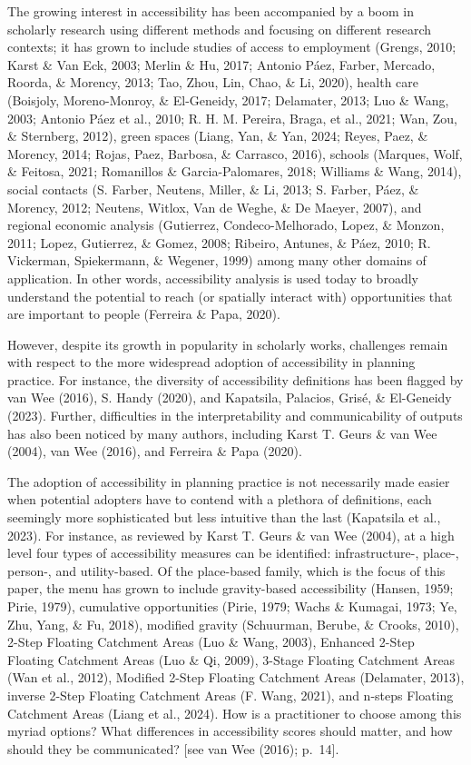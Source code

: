 \documentclass[
11pt, %
oneside, %
english, %
singlespacing, %
]{macthesis} %
\begin{document}
The growing interest in accessibility has been accompanied by a boom in scholarly research using different methods and focusing on different research contexts; it has grown to include studies of access to employment (Grengs, 2010; Karst \& Van Eck, 2003; Merlin \& Hu, 2017; Antonio Páez, Farber, Mercado, Roorda, \& Morency, 2013; Tao, Zhou, Lin, Chao, \& Li, 2020), health care (Boisjoly, Moreno-Monroy, \& El-Geneidy, 2017; Delamater, 2013; Luo \& Wang, 2003; Antonio Páez et al., 2010; R. H. M. Pereira, Braga, et al., 2021; Wan, Zou, \& Sternberg, 2012), green spaces (Liang, Yan, \& Yan, 2024; Reyes, Paez, \& Morency, 2014; Rojas, Paez, Barbosa, \& Carrasco, 2016), schools (Marques, Wolf, \& Feitosa, 2021; Romanillos \& Garcia-Palomares, 2018; Williams \& Wang, 2014), social contacts (S. Farber, Neutens, Miller, \& Li, 2013; S. Farber, Páez, \& Morency, 2012; Neutens, Witlox, Van de Weghe, \& De Maeyer, 2007), and regional economic analysis (Gutierrez, Condeco-Melhorado, Lopez, \& Monzon, 2011; Lopez, Gutierrez, \& Gomez, 2008; Ribeiro, Antunes, \& Páez, 2010; R. Vickerman, Spiekermann, \& Wegener, 1999) among many other domains of application. In other words, accessibility analysis is used today to broadly understand the potential to reach (or spatially interact with) opportunities that are important to people (Ferreira \& Papa, 2020).

However, despite its growth in popularity in scholarly works, challenges remain with respect to the more widespread adoption of accessibility in planning practice. For instance, the diversity of accessibility definitions has been flagged by van Wee (2016), S. Handy (2020), and Kapatsila, Palacios, Grisé, \& El-Geneidy (2023). Further, difficulties in the interpretability and communicability of outputs has also been noticed by many authors, including Karst T. Geurs \& van Wee (2004), van Wee (2016), and Ferreira \& Papa (2020).

The adoption of accessibility in planning practice is not necessarily made easier when potential adopters have to contend with a plethora of definitions, each seemingly more sophisticated but less intuitive than the last (Kapatsila et al., 2023). For instance, as reviewed by Karst T. Geurs \& van Wee (2004), at a high level four types of accessibility measures can be identified: infrastructure-, place-, person-, and utility-based. Of the place-based family, which is the focus of this paper, the menu has grown to include gravity-based accessibility (Hansen, 1959; Pirie, 1979), cumulative opportunities (Pirie, 1979; Wachs \& Kumagai, 1973; Ye, Zhu, Yang, \& Fu, 2018), modified gravity (Schuurman, Berube, \& Crooks, 2010), 2-Step Floating Catchment Areas (Luo \& Wang, 2003), Enhanced 2-Step Floating Catchment Areas (Luo \& Qi, 2009), 3-Stage Floating Catchment Areas (Wan et al., 2012), Modified 2-Step Floating Catchment Areas (Delamater, 2013), inverse 2-Step Floating Catchment Areas (F. Wang, 2021), and n-steps Floating Catchment Areas (Liang et al., 2024). How is a practitioner to choose among this myriad options? What differences in accessibility scores should matter, and how should they be communicated? {[}see van Wee (2016); p.~14{]}.
\end{document}
